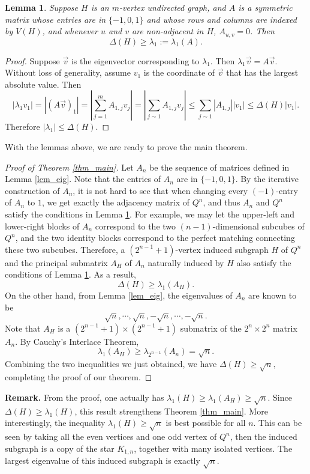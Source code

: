 \documentclass[12pt]{article}
\theoremstyle{plain}
\newtheorem{lemma}[theorem]{Lemma}
\theoremstyle{definition}
\begin{document}
\begin{lemma}\label{lem_key}
Suppose $H$ is an $m$-vertex undirected graph, and $A$ is a symmetric matrix whose entries are in $\{-1, 0, 1\}$ and whose rows and columns are indexed by $V(H)$, and whenever $u$ and $v$ are non-adjacent in $H$, $A_{u,v}=0$. Then 
$$\Delta(H) \ge \lambda_1:=\lambda_1(A).$$  
\end{lemma}
\begin{proof}
Suppose $\vec{v}$ is the eigenvector corresponding to $\lambda_1$. Then $\lambda_1 \vec{v} = A \vec{v}.$
Without loss of generality, assume $v_1$ is the coordinate of $\vec{v}$ that has the largest absolute value. Then
$$|\lambda_1v_1| = |(A \vec{v})_1| = \left|\sum_{j=1}^m A_{1, j} v_j\right| = \left|\sum_{j \sim 1} A_{1, j} v_j \right| \le \sum_{j \sim 1} |A_{1, j}||v_1| \le \Delta(H) |v_1|.$$
Therefore $|\lambda_1| \le \Delta(H)$.
\end{proof}
With the lemmas above, we are ready to prove the main theorem.
\begin{proof}[Proof of Theorem \ref{thm_main}]
Let $A_n$ be the sequence of matrices defined in Lemma \ref{lem_eig}. Note that the entries of $A_n$ are in $\{-1,0,1\}$. By the iterative construction of $A_n$, it is not hard to see that when changing every $(-1)$-entry of $A_n$ to $1$, we get exactly the adjacency matrix of $Q^n$, and thus $A_n$ and $Q^n$ satisfy the conditions in Lemma \ref{lem_key}. For example, we may let the upper-left and lower-right blocks of $A_n$ correspond to the two $(n-1)$-dimensional subcubes of $Q^n$, and the two identity blocks correspond to the perfect matching connecting these two subcubes. Therefore, a $(2^{n-1}+1)$-vertex induced subgraph $H$ of $Q^n$ and the principal submatrix $A_H$ of $A_{n}$ naturally induced by $H$ also satisfy the conditions of Lemma \ref{lem_key}. As a result,
$$\Delta(H) \ge \lambda_1(A_H).$$
On the other hand, from Lemma \ref{lem_eig}, the eigenvalues of $A_n$ are known to be 
$$\sqrt{n}, \cdots, \sqrt{n}, -\sqrt{n}, \cdots, -\sqrt{n}.$$
Note that $A_H$ is a $(2^{n-1}+1) \times (2^{n-1}+1)$ submatrix of the $2^n \times 2^n$ matrix $A_n$. By Cauchy's Interlace Theorem,
$$\lambda_1(A_H) \ge \lambda_{2^{n-1}}(A_n)=\sqrt{n}.$$
Combining the two inequalities we just obtained, we have
$\Delta(H) \ge \sqrt{n},$ completing the proof of our theorem.
\end{proof}

\noindent \textbf{Remark.} From the proof, one actually has $\lambda_1(H) \ge \lambda_1(A_H) \ge \sqrt{n}$. Since $\Delta(H) \ge \lambda_1(H)$, this result strengthens Theorem \ref{thm_main}. More interestingly, the inequality $\lambda_1(H) \ge \sqrt{n}$ is best possible for all $n$. This can be seen by taking all the even vertices and one odd vertex of $Q^n$, then the induced subgraph is a copy of the star $K_{1, n}$, together with many isolated vertices. The largest eigenvalue of this induced subgraph is exactly $\sqrt{n}$.
\end{document}
